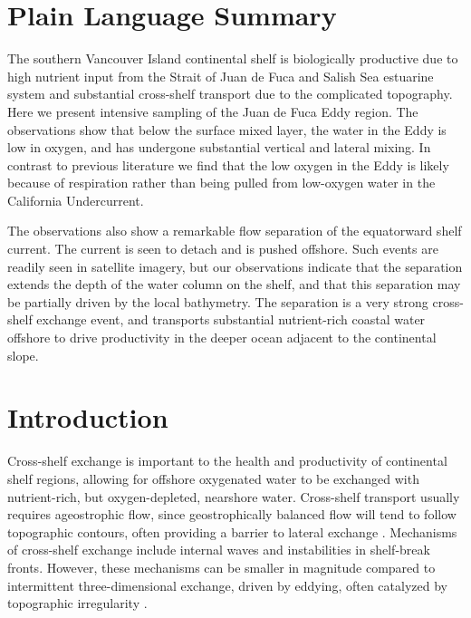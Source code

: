 \documentclass[draft]{agujournal2019}
\begin{document}
\section*{Plain Language Summary}

The southern Vancouver Island continental shelf is biologically productive due to high nutrient input from the Strait of Juan de Fuca and Salish Sea estuarine system and substantial cross-shelf transport due to the complicated topography.  Here we present intensive sampling of the Juan de Fuca Eddy region. The observations show that below the surface mixed layer, the water in the Eddy is low in oxygen, and has undergone substantial vertical and lateral mixing. In contrast to previous literature we find that the low oxygen in the Eddy is likely because of respiration rather than being pulled from low-oxygen water in the California Undercurrent.

The observations also show a remarkable flow separation of the equatorward shelf current.  The current is seen to detach and is pushed offshore. Such events are readily seen in satellite imagery, but our observations indicate that the separation extends the depth of the water column on the shelf, and that this separation may be partially driven by the local bathymetry.  The separation is a very strong cross-shelf exchange event, and transports substantial nutrient-rich coastal water offshore to drive productivity in the deeper ocean adjacent to the continental slope.

%
%


\section{Introduction}

Cross-shelf exchange is important to the health and productivity of continental shelf regions, allowing for offshore oxygenated water to be exchanged with nutrient-rich, but oxygen-depleted, nearshore water.  Cross-shelf transport usually requires ageostrophic flow, since geostrophically balanced flow will tend to follow topographic contours, often providing a barrier to lateral exchange \cite{brink16}.  Mechanisms of cross-shelf exchange include internal waves and instabilities in shelf-break fronts.  However, these mechanisms can be smaller in magnitude compared to intermittent three-dimensional exchange, driven by eddying, often catalyzed by topographic irregularity \cite{barthetal00}.
\end{document}
